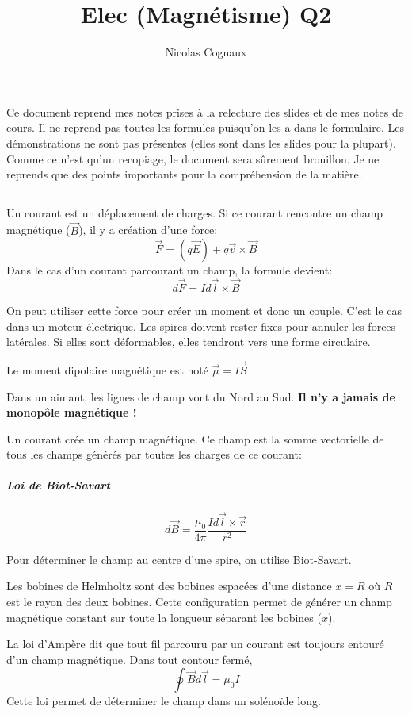 \documentclass[11pt,a4paper]{article} %
\title{Elec (Magnétisme) Q2}
\author{Nicolas Cognaux}
\newcommand{\B}{\vec B}
\begin{document}
\maketitle
Ce document reprend mes notes prises à la relecture des slides et de mes notes de cours. Il ne reprend pas toutes les formules puisqu'on les a dans le formulaire. Les démonstrations ne sont pas présentes (elles sont dans les slides pour la plupart). 
Comme ce n'est qu'un recopiage, le document sera sûrement brouillon. Je ne reprends que des points importants pour la compréhension de la matière.

\rule{\linewidth}{.5pt}


Un courant est un déplacement de charges. Si ce courant rencontre un champ magnétique ($\vec B$), il y a création d'une force:
$$ \vec F = (q \vec E) + q \vec v \times \B $$
Dans le cas d'un courant parcourant un champ, la formule devient:
$$ d\vec F = Id\vec l \times \B $$

On peut utiliser cette force pour créer un moment et donc un couple. C'est le cas dans un moteur électrique. Les spires doivent rester fixes pour annuler les forces latérales. Si elles sont déformables, elles tendront vers une forme circulaire.

Le moment dipolaire magnétique est noté $\vec \mu = I \vec S$

Dans un aimant, les lignes de champ vont du Nord au Sud. { \bf Il n'y a jamais de monopôle magnétique !}

Un courant crée un champ magnétique. Ce champ est la somme vectorielle de tous les champs générés par toutes les charges de ce courant:
\subparagraph{Loi de Biot-Savart}
$$ d\B = \frac{\mu_0}{4\pi}\frac{Id\vec l\times \vec r}{r^2} $$

Pour déterminer le champ au centre d'une spire, on utilise Biot-Savart.

Les bobines de Helmholtz sont des bobines espacées d'une distance $x = R$ où $R$ est le rayon des deux bobines. Cette configuration permet de générer un champ magnétique constant sur toute la longueur séparant les bobines ($x$).

La loi d'Ampère dit que tout fil parcouru par un courant est toujours entouré d'un champ magnétique. Dans tout contour fermé,
$$\oint \B d\vec l = \mu_0 I$$
Cette loi permet de déterminer le champ dans un solénoïde long.
\end{document}
